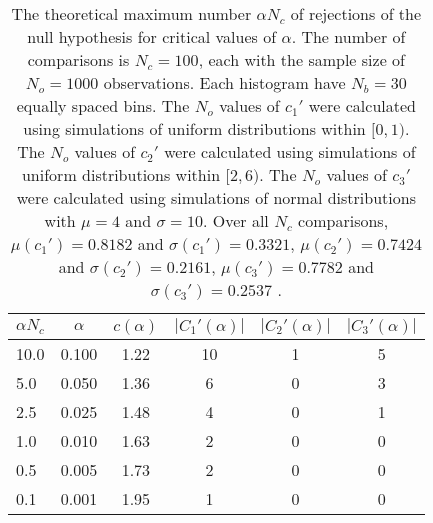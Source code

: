 \begin{table}[h!]
\begin{center}
\begin{tabular}{| l | c | c | c | c | c |}\hline
$\alpha N_c$ & $\alpha$ & $c(\alpha)$ & $|C_1'(\alpha)|$ & $|C_2'(\alpha)|$ & $|C_3'(\alpha)|$ \\\hline
10.0 & 0.100 & 1.22 & 10 & 1 & 5 \\\hline
5.0 & 0.050 & 1.36 & 6 & 0 & 3 \\\hline
2.5 & 0.025 & 1.48 & 4 & 0 & 1 \\\hline
1.0 & 0.010 & 1.63 & 2 & 0 & 0 \\\hline
0.5 & 0.005 & 1.73 & 2 & 0 & 0 \\\hline
0.1 & 0.001 & 1.95 & 1 & 0 & 0 \\\hline
\end{tabular}
\caption{The theoretical maximum number $\alpha N_c$ of rejections
of the null hypothesis for critical values of $\alpha$.
The number of comparisons is $N_c=100$,
each with the sample size of $N_o=1000$ observations.
Each histogram have $N_b=30$ equally spaced bins.
The $N_o$ values of $c_1'$ were calculated using simulations of
 uniform distributions within $[0,1)$.
The $N_o$ values of $c_2'$ were calculated using simulations of
 uniform distributions within $[2,6)$.
The $N_o$ values of $c_3'$ were calculated using simulations of
 normal distributions with $\mu=4$ and $\sigma=10$.
Over all $N_c$ comparisons,
 $\mu(c_1')=0.8182$ and $\sigma(c_1')=0.3321$,
 $\mu(c_2')=0.7424$ and $\sigma(c_2')=0.2161$,
 $\mu(c_3')=0.7782$ and $\sigma(c_3')=0.2537$ .
}
\end{center}
\end{table}
